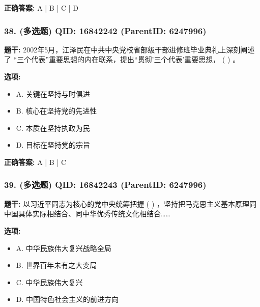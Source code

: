 \documentclass[12pt,UTF8]{ctexart}
\begin{document}
\textbf{正确答案:}
A | B | C | D

\vspace{0.3em}\hrulefill\vspace{0.7em}

\subsubsection*{38. (多选题) \small QID: 16842242 (ParentID: 6247996)}

\textbf{题干:}
2002年5月，江泽民在中共中央党校省部级干部进修班毕业典礼上深刻阐述了 “三个代表”重要思想的内在联系，提出“贯彻’三个代表’重要思想， ( ) 。



\textbf{选项:}
\begin{itemize}[leftmargin=*]

  \item A. 关键在坚持与时俱进

  \item B. 核心在坚持党的先进性

  \item C. 本质在坚持执政为民

  \item D. 目标在坚持党的宗旨

\end{itemize}

\textbf{正确答案:}
A | B | C

\vspace{0.3em}\hrulefill\vspace{0.7em}

\subsubsection*{39. (多选题) \small QID: 16842243 (ParentID: 6247996)}

\textbf{题干:}
以习近平同志为核心的党中央统筹把握 ( ) ，坚持把马克思主义基本原理同中国具体实际相结合、同中华优秀传统文化相结合……



\textbf{选项:}
\begin{itemize}[leftmargin=*]

  \item A. 中华民族伟大复兴战略全局

  \item B. 世界百年未有之大变局

  \item C. 中华民族伟大复兴

  \item D. 中国特色社会主义的前进方向

\end{itemize}
\end{document}
